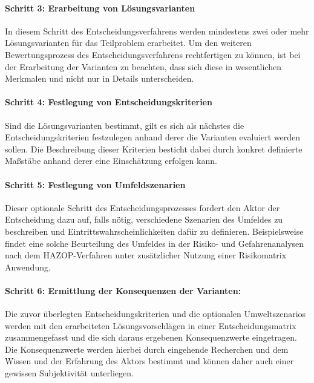 \paragraph{Schritt 3: Erarbeitung von Lösungsvarianten} In diesem Schritt des Entscheidungsverfahrens werden mindestens zwei oder mehr Lösungsvarianten für das Teilproblem erarbeitet. Um den weiteren Bewertungsprozess des Entscheidungsverfahrens rechtfertigen zu können, ist bei der Erarbeitung der Varianten zu beachten, dass sich diese in wesentlichen Merkmalen und nicht nur in Details unterscheiden. 
\vspace*{-2.5mm}
\paragraph{Schritt 4: Festlegung von Entscheidungskriterien} Sind die Lösungsvarianten bestimmt, gilt es sich als nächstes die Entscheidungskriterien festzulegen anhand derer die Varianten evaluiert werden sollen. Die Beschreibung dieser Kriterien besticht dabei durch konkret definierte Maßstäbe anhand derer eine Einschätzung erfolgen kann.
\vspace*{-2.5mm}
\paragraph{Schritt 5: Festlegung von Umfeldszenarien} Dieser optionale Schritt des Entscheidungsprozesses fordert den Aktor der Entscheidung dazu auf, falls nötig, verschiedene Szenarien des Umfeldes zu beschreiben und Eintrittswahrscheinlichkeiten dafür zu definieren. Beispielsweise findet eine solche Beurteilung des Umfeldes in der Risiko- und Gefahrenanalysen nach dem HAZOP-Verfahren unter zusätzlicher Nutzung einer Risikomatrix Anwendung.
\vspace*{-2.5mm}
\paragraph{Schritt 6: Ermittlung der Konsequenzen der Varianten:} Die zuvor überlegten Entscheidungskriterien und die optionalen Umweltszenarios werden mit den erarbeiteten Lösungsvorschlägen in einer Entscheidungsmatrix zusammengefasst und die sich daraus ergebenen Konsequenzwerte eingetragen. Die Konsequenzwerte werden hierbei durch eingehende Recherchen und dem Wissen und der Erfahrung des Aktors bestimmt und können daher auch einer gewissen Subjektivität unterliegen.
\vspace*{-2.5mm}
